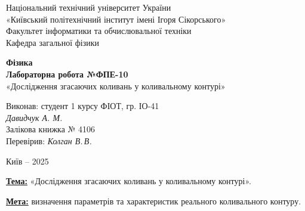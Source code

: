 \documentclass[12pt,a4paper]{article}
\begin{document}
    \begin{titlepage}

        \thispagestyle{empty}
        \begin{center}
        \large
        Національний технічний університет України\\
        «Київський політехнічний інститут імені Ігоря Сікорського»\\[1em]
        Факультет інформатики та обчислювальної техніки\\
        Кафедра загальної фізики
        \end{center}

        \vfill

        \begin{center}
        \textbf{\LARGE Фізика}\\[2em]
        \textbf{\Large Лабораторна робота №ФПЕ-10}\\
        «Дослідження згасаючих коливань у коливальному контурі» 
        \end{center}

        \vfill

        \begin{flushright}
        Виконав: студент 1 курсу ФІОТ, гр. ІО-41\\
        \textit{Давидчук А. М.}\\
        Залікова книжка № 4106\\[1em]
        Перевірив: \textit{Колган В.\,В.}
        \end{flushright}

        \vfill

        \begin{center}
        Київ -- 2025
        \end{center}

    \end{titlepage}

    \setlength{\parindent}{0pt}


    \textbf{\underline{Тема:}} «Дослідження згасаючих коливань у коливальному контурі».

    \vspace{1em} %

    \textbf{\underline{Мета:}} визначення параметрів та характеристик реального коливального контуру.

    \vspace{1em} %
\end{document}
